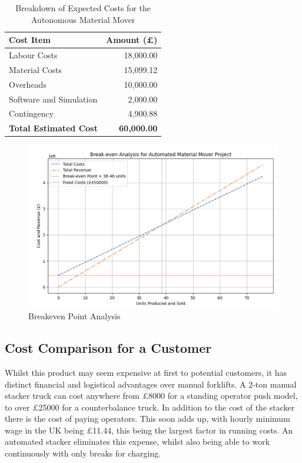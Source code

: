 \documentclass[12pt]{article}
\begin{document}
\begin{table}[h!]
    \centering
    \begin{tabular}{|l|r|}
        \hline
        \textbf{Cost Item}          & \textbf{Amount (£)} \\ \hline
        Labour Costs                 & 18,000.00           \\ \hline
        Material Costs              & 15,099.12           \\ \hline
        Overheads                   & 10,000.00           \\ \hline
        Software and Simulation     & 2,000.00            \\ \hline
        Contingency                 & 4,900.88            \\ \hline
        \textbf{Total Estimated Cost} & \textbf{60,000.00}  \\ \hline
    \end{tabular}
    \caption{Breakdown of Expected Costs for the Autonomous Material Mover}
    \label{tab:expected_costs}
\end{table}

\begin{figure}[ht]
    \centering
    \includegraphics[width=1\textwidth]{breakeven.png}  %
    \caption{Breakeven Point Analysis}
    \label{fig:breakeven}
\end{figure} 

\FloatBarrier
\subsection{Cost Comparison for a Customer}
Whilst this product may seem expensive at first to potential customers, it has distinct financial and logistical advantages over manual forklifts. A 2-ton manual stacker truck can cost anywhere from £8000 for a standing operator push model, to over £25000 for a counterbalance truck. In addition to the cost of the stacker there is the cost of paying operators. 
This soon adds up, with hourly minimum wage in the UK being £11.44, this being the largest factor in running costs. An automated stacker eliminates this expense, whilst also being able to work continuously with only breaks for charging.
\end{document}
